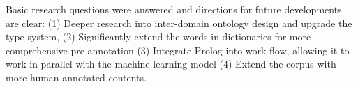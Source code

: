\documentclass{article} %
\begin{document}
Basic research questions were answered and directions for future developments are clear: (1) Deeper research into inter-domain ontology design and upgrade the type system, (2) Significantly extend the words in dictionaries for more comprehensive pre-annotation (3) Integrate Prolog into work flow, allowing it to work in parallel with the machine learning model (4) Extend the corpus with more human annotated contents.



\end{document}
